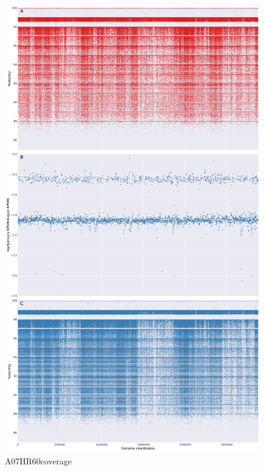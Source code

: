 \begin{figure}[!hbtp]
  \centering
  \includegraphics[width=\textwidth,height=\textheight,keepaspectratio]{Chapter5/Figures/coverage_plots/A07HR60_coverage.pdf}
  \caption{A07HR60coverage}
  \label{A07HR60coverage}
\end{figure}

